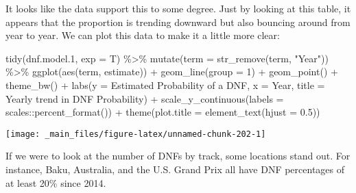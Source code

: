 \documentclass[
]{book}
\newenvironment{Shaded}{\begin{snugshade}}{\end{snugshade}}
\newcommand{\AttributeTok}[1]{\textcolor[rgb]{0.77,0.63,0.00}{#1}}
\newcommand{\DecValTok}[1]{\textcolor[rgb]{0.00,0.00,0.81}{#1}}
\newcommand{\FloatTok}[1]{\textcolor[rgb]{0.00,0.00,0.81}{#1}}
\newcommand{\FunctionTok}[1]{\textcolor[rgb]{0.00,0.00,0.00}{#1}}
\newcommand{\NormalTok}[1]{#1}
\newcommand{\SpecialCharTok}[1]{\textcolor[rgb]{0.00,0.00,0.00}{#1}}
\newcommand{\StringTok}[1]{\textcolor[rgb]{0.31,0.60,0.02}{#1}}
\begin{document}
It looks like the data support this to some degree. Just by looking at this table, it appears that the proportion is trending downward but also bouncing around from year to year. We can plot this data to make it a little more clear:

\begin{Shaded}
\begin{Highlighting}[]
\FunctionTok{tidy}\NormalTok{(dnf.model}\FloatTok{.1}\NormalTok{, }\AttributeTok{exp =}\NormalTok{ T) }\SpecialCharTok{\%\textgreater{}\%}
  \FunctionTok{mutate}\NormalTok{(}\AttributeTok{term =} \FunctionTok{str\_remove}\NormalTok{(term, }\StringTok{"Year"}\NormalTok{)) }\SpecialCharTok{\%\textgreater{}\%} 
  \FunctionTok{ggplot}\NormalTok{(}\FunctionTok{aes}\NormalTok{(term, estimate)) }\SpecialCharTok{+}
  \FunctionTok{geom\_line}\NormalTok{(}\AttributeTok{group =} \DecValTok{1}\NormalTok{) }\SpecialCharTok{+}
  \FunctionTok{geom\_point}\NormalTok{() }\SpecialCharTok{+} 
  \FunctionTok{theme\_bw}\NormalTok{() }\SpecialCharTok{+}
  \FunctionTok{labs}\NormalTok{(}\AttributeTok{y =} \StringTok{\textquotesingle{}Estimated Probability of a DNF\textquotesingle{}}\NormalTok{,}
       \AttributeTok{x =} \StringTok{\textquotesingle{}Year\textquotesingle{}}\NormalTok{,}
       \AttributeTok{title =} \StringTok{\textquotesingle{}Yearly trend in DNF Probability\textquotesingle{}}\NormalTok{) }\SpecialCharTok{+}
\FunctionTok{scale\_y\_continuous}\NormalTok{(}\AttributeTok{labels =}\NormalTok{ scales}\SpecialCharTok{::}\FunctionTok{percent\_format}\NormalTok{()) }\SpecialCharTok{+}
  \FunctionTok{theme}\NormalTok{(}\AttributeTok{plot.title =} \FunctionTok{element\_text}\NormalTok{(}\AttributeTok{hjust =} \FloatTok{0.5}\NormalTok{))}
\end{Highlighting}
\end{Shaded}

\begin{center}\texttt{[image: \_main\_files/figure-latex/unnamed-chunk-202-1]} \end{center}

If we were to look at the number of DNFs by track, some locations stand out. For instance, Baku, Australia, and the U.S. Grand Prix all have DNF percentages of at least 20\% since 2014.
\end{document}
